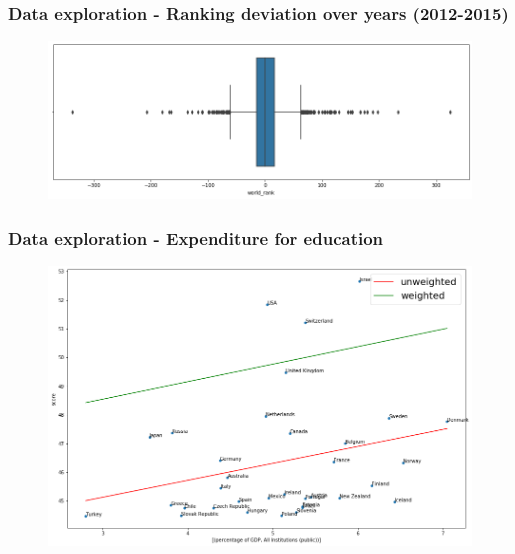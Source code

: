 \documentclass[mathserif,notheorems,11pt]{beamer}
\begin{document}
\begin{frame}
\frametitle{Data exploration - Ranking deviation over years (2012-2015)}
\begin{figure}
	\centering
	\includegraphics[width=1\linewidth]{graphs/world_rank_diff_bp}
\end{figure}
\end{frame}


\begin{frame}
\frametitle{Data exploration - Expenditure for education}
\begin{figure}
	\centering
	\includegraphics[width=1\linewidth]{graphs/exp_mean_all}
\end{figure}

\end{frame}
\end{document}
